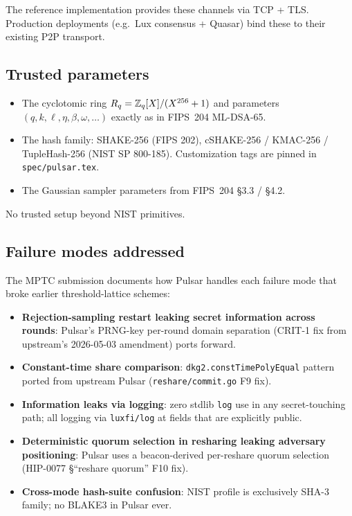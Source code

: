 The reference implementation provides these channels via TCP + TLS.
Production deployments (e.g.\ Lux consensus + Quasar) bind these to
their existing P2P transport.

\subsection{Trusted parameters}

\begin{itemize}[leftmargin=*, itemsep=0pt]
\item The cyclotomic ring $R_q = \mathbb{Z}_q[X] / (X^{256} + 1)$ and
parameters $(q, k, \ell, \eta, \beta, \omega, \ldots)$ exactly as in
FIPS~204 ML-DSA-65.
\item The hash family: SHAKE-256 (FIPS 202), cSHAKE-256 / KMAC-256 /
TupleHash-256 (NIST SP 800-185). Customization tags are pinned in
\texttt{spec/pulsar.tex}.
\item The Gaussian sampler parameters from FIPS~204 \S3.3 / \S4.2.
\end{itemize}

No trusted setup beyond NIST primitives.

\subsection{Failure modes addressed}

The MPTC submission documents how Pulsar handles each failure
mode that broke earlier threshold-lattice schemes:

\begin{itemize}[leftmargin=*, itemsep=0pt]
\item \textbf{Rejection-sampling restart leaking secret information
across rounds}: Pulsar's PRNG-key per-round domain separation
(CRIT-1 fix from upstream's 2026-05-03 amendment) ports forward.
\item \textbf{Constant-time share comparison}:
\texttt{dkg2.constTimePolyEqual} pattern ported from upstream
Pulsar (\texttt{reshare/commit.go} F9 fix).
\item \textbf{Information leaks via logging}: zero stdlib
\texttt{log} use in any secret-touching path; all logging via
\texttt{luxfi/log} at fields that are explicitly public.
\item \textbf{Deterministic quorum selection in resharing leaking
adversary positioning}: Pulsar uses a beacon-derived per-reshare
quorum selection (HIP-0077 \S``reshare quorum'' F10 fix).
\item \textbf{Cross-mode hash-suite confusion}: NIST profile is
exclusively SHA-3 family; no BLAKE3 in Pulsar ever.
\end{itemize}
